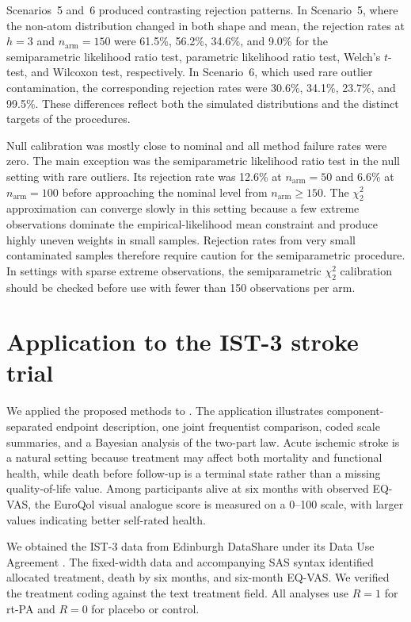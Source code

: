\documentclass[11pt]{article}
\begin{document}
Scenarios~5 and~6 produced contrasting rejection patterns. In Scenario~5, where the non-atom distribution changed in both shape and mean, the rejection rates at $h=3$ and $n_{\mathrm{arm}}=150$ were 61.5\%, 56.2\%, 34.6\%, and 9.0\% for the semiparametric likelihood ratio test, parametric likelihood ratio test, Welch's $t$-test, and Wilcoxon test, respectively. In Scenario~6, which used rare outlier contamination, the corresponding rejection rates were 30.6\%, 34.1\%, 23.7\%, and 99.5\%. These differences reflect both the simulated distributions and the distinct targets of the procedures.

Null calibration was mostly close to nominal and all method failure rates were zero. The main exception was the semiparametric likelihood ratio test in the null setting with rare outliers. Its rejection rate was 12.6\% at $n_{\mathrm{arm}}=50$ and 6.6\% at $n_{\mathrm{arm}}=100$ before approaching the nominal level from $n_{\mathrm{arm}}\geq150$. The $\chi^2_2$ approximation can converge slowly in this setting because a few extreme observations dominate the empirical-likelihood mean constraint and produce highly uneven weights in small samples. Rejection rates from very small contaminated samples therefore require caution for the semiparametric procedure. In settings with sparse extreme observations, the semiparametric $\chi^2_2$ calibration should be checked before use with fewer than 150 observations per arm.

\section{Application to the IST-3 stroke trial}\label{sec:application}

We applied the proposed methods to \ApplicationDatasetDescription{} \citep{IST3Lancet2012,IST3DataShare}. The application illustrates component-separated endpoint description, one joint frequentist comparison, coded scale summaries, and a Bayesian analysis of the two-part law. Acute ischemic stroke is a natural setting because treatment may affect both mortality and functional health, while death before follow-up is a terminal state rather than a missing quality-of-life value. Among participants alive at six months with observed EQ-VAS, the EuroQol visual analogue score is measured on a 0--100 scale, with larger values indicating better self-rated health.

We obtained the IST-3 data from Edinburgh DataShare under its Data Use Agreement \citep{IST3DataShare}. The fixed-width data and accompanying SAS syntax identified allocated treatment, death by six months, and six-month EQ-VAS\@. We verified the treatment coding against the text treatment field. All analyses use $R=1$ for rt-PA and $R=0$ for placebo or control.
\end{document}
